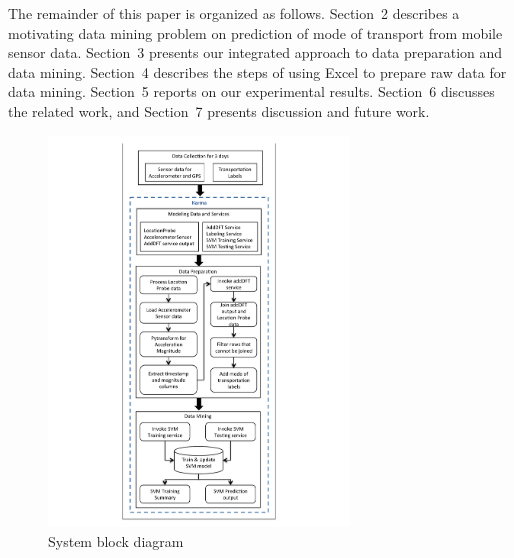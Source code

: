 The remainder of this paper is organized as follows. Section~2 describes a motivating data mining problem on prediction of mode of transport from mobile sensor data. Section~3 presents our integrated approach to data preparation and data mining. Section~4 describes the steps of using Excel to prepare raw data for data mining. Section~5 reports on our experimental results. Section~6 discusses the related work, and Section~7 presents discussion and future work.

\begin{figure}[ht!]
\centering
\includegraphics[width=80mm]{img/system_diagram.pdf}
\caption{System block diagram\label{fig:system_diagram}}
\end{figure}
